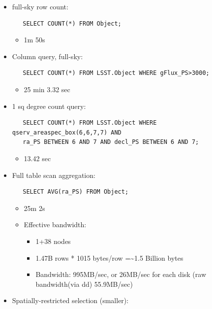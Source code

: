 \documentclass[DM,toc]{lsstdoc}
\begin{document}
\begin{itemize}
\item
  full-sky row count:

\begin{verbatim}
   SELECT COUNT(*) FROM Object;
\end{verbatim}

  \begin{itemize}
  \item
    1m 50s
  \end{itemize}
\item
  Column query, full-sky:

\begin{verbatim}
   SELECT COUNT(*) FROM LSST.Object WHERE gFlux_PS>3000;
\end{verbatim}

  \begin{itemize}
  \item
    25 min 3.32 sec
  \end{itemize}
\item
  1 sq degree count query:

\begin{verbatim}
   SELECT COUNT(*) FROM LSST.Object WHERE qserv_areaspec_box(6,6,7,7) AND
   ra_PS BETWEEN 6 AND 7 AND decl_PS BETWEEN 6 AND 7;
\end{verbatim}

  \begin{itemize}
  \item
    13.42 sec
  \end{itemize}
\item
  Full table scan aggregation:

\begin{verbatim}
   SELECT AVG(ra_PS) FROM Object;
\end{verbatim}

  \begin{itemize}
  \item
    25m 2s
  \item
    Effective bandwidth:

    \begin{itemize}
    \item
      1+38 nodes
    \item
      1.47B rows * 1015 bytes/row =\textasciitilde{}1.5 Billion bytes
    \item
      Bandwidth: 995MB/sec, or 26MB/sec for each disk (raw bandwidth(via
      dd) 55.9MB/sec)
    \end{itemize}
  \end{itemize}
\item
  Spatially-restricted selection (smaller):


\end{itemize}
\end{document}
